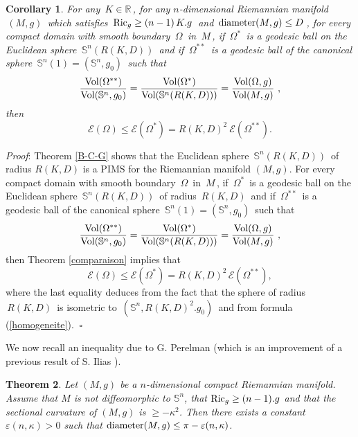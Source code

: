 \documentclass[11pt, reqno]{amsart}
\newtheorem{theoreme}{Theorem}[section]
\newtheorem{corollaire}[theoreme]{Corollary}
\theoremstyle{plain}
\begin{document}
\begin{corollaire}\label{compsphere3}
For any $\,K \in \mathbb R\,$, for any $n$-dimensional Riemannian manifold $\,(M,g)\,$ 
which satisfies $\,{\rm Ric}_g \ge (n-1)\,K .g\,$ and $\, {\rm diameter} (M,g) \le D\,$, 
for every compact domain with smooth boundary $\,\Omega \,$ in $\, M \,$, if 
$\,\Omega^*\,$ is a geodesic ball on the Euclidean sphere 
$\, \mathbb S^n (R(K , D))\,$
and if $\,\Omega^{**}\,$ is a geodesic ball of  the canonical sphere 
$\, \mathbb S^n (1) = (\mathbb S^n , g_0 )\,$ such that 
$$\dfrac{{\rm Vol} (\Omega^{**})}{{\rm Vol} (\mathbb S^n , g_0 )} =
\dfrac{{\rm Vol} (\Omega^* )}{{\rm Vol} (\mathbb S^n (R(K , D)))} 
= \dfrac{{\rm Vol} (\Omega , g )}{{\rm Vol} (M , g )}\ ,$$ 
then
\begin{equation}
{\mathcal E} (\Omega) \le {\mathcal E} (\Omega^*) = R(K,D)^2 \ {\mathcal E} (\Omega^{**}).
\end{equation}
\end{corollaire}
\noindent
 {\it Proof}: Theorem \ref{B-C-G} shows that 
the Euclidean sphere $\, \mathbb S^n (R(K , D))\,$ of radius 
$R(K, D)$ is a PIMS for the Riemannian manifold $(M,g)$. 
For every compact domain with smooth boundary $\,\Omega \,$ in 
$\, M \,$, if $\,\Omega^*\,$ is a geodesic ball on the Euclidean sphere 
$\, \mathbb S^n (R(K , D))\,$ of radius $\,R(K , D)\,$ and if $\,\Omega^{**}\,$ 
is a geodesic ball of the canonical sphere 
$\, \mathbb S^n (1) = (\mathbb S^n , g_0 )\,$ such that 
$$\dfrac{{\rm Vol} (\Omega^{**})}{{\rm Vol} (\mathbb S^n , g_0 )} =
\dfrac{{\rm Vol} (\Omega^* )}{{\rm Vol} (\mathbb S^n (R(K , D)))} 
= \dfrac{{\rm Vol} (\Omega , g )}{{\rm Vol} (M , g )}\ ,$$ 
then Theorem \ref{comparaison} implies that 
$$
{\mathcal E} (\Omega) \le {\mathcal E} (\Omega^*) = R(K,D)^2 \,{\mathcal E} (\Omega^{**}),
$$
where the last equality deduces from the fact that the sphere of radius $\,R(K, D) \,$ is
isometric to $\,(\mathbb S^n , R(K,D)^2 . g_0 )\,$ and from
 formula (\ref{homogeneite}). $\ \square$

\vskip 0.5cm

We now recall an inequality due to G. Perelman \cite{Pe} (which is an improvement of a previous result of S. Ilias \cite{Il}).

\begin{theoreme}\label{Perelman}
Let $(M, g)$ be a $n$-dimensional  compact Riemannian manifold.
Assume that $M$ is {\em not} diffeomorphic to $\mathbb S^n$, that ${\rm Ric}_g \ge (n-1).g$ and that the sectional curvature of $(M , g)$ is  $ \geq - \kappa^2$.
Then there exists a constant  $\varepsilon (n , \kappa) > 0$
such that ${\rm diameter} (M,g) \leq \pi - \varepsilon (n , \kappa)$.
\end{theoreme}
\end{document}
